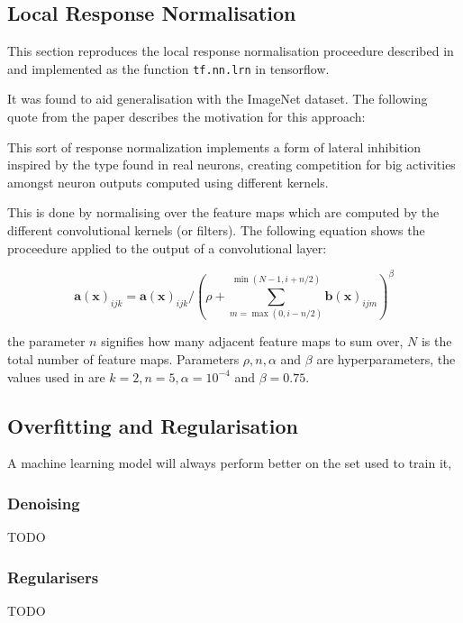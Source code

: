   \subsection{Local Response Normalisation} \label{sec:lrn}
    This section reproduces the local response normalisation proceedure described in \cite{Krizhevsky2012}
    and implemented as the function \texttt{tf.nn.lrn} in tensorflow.

    It was found to aid generalisation with the ImageNet dataset. The following quote from the paper \cite{Krizhevsky2012}
    describes the motivation for this approach:

    \begin{displayquote}
      This sort of response normalization implements a form of lateral inhibition
      inspired by the type found in real neurons, creating competition for big activities amongst neuron
      outputs computed using different kernels.
    \end{displayquote}

    This is done by normalising over the feature maps which are computed by the different convolutional kernels (or filters).
    The following equation shows the proceedure applied to the output of a convolutional layer:

    \begin{equation} \label{eq:lrn}
      \mathbf{a}(\mathbf{x})_{ijk}
      = \mathbf{a}(\mathbf{x})_{ijk}/\left (\rho + \sum^{\min(N-1,i+n/2)}_{m=\max(0,i-n/2)}\mathbf{b}(\mathbf{x})_{ijm} \right )^\beta
    \end{equation}

    the parameter $n$ signifies how many adjacent feature maps to sum over, $N$ is the total number of feature maps.
    Parameters $\rho,n,\alpha$ and $\beta$ are hyperparameters, the values used in \cite{Krizhevsky2012} are
    $k=2,n=5,\alpha=10^{-4}$ and $\beta=0.75$.

  \subsection{Overfitting and Regularisation}
  A machine learning model will always perform better on the set used
  to train it,
  \subsubsection{Denoising}
    {\color{red} TODO}
  \subsubsection{Regularisers}
    {\color{red} TODO}
